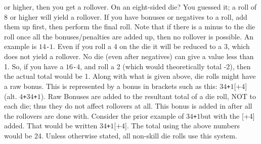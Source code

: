 \documentclass[twoside]{book}
\begin{document}
               or higher, then you get a rollover. On an eight-sided die?
               You guessed it; a roll of 8 or higher will yield a
               rollover.  If you have bonuses or negatives to a roll, add them
               up first, then perform the final roll.  Note that if there is a minus to the die roll once
               all the bonuses/penalties are added up, then no rollover
               is possible. An example is \ensuremath{1}\ensuremath{4}\texttt{-}\ensuremath{1}. Even if you roll a 4 on
               the die it will be reduced to a 3, which does not yield a
               rollover. No die (even after negatives) can give a value
               less than 1. So, if you have a \ensuremath{1}\ensuremath{6}\texttt{-}\ensuremath{4}, and roll a 2 (which
               would theoretically total -2), then the actual total would
               be 1.  Along with what is given above, die rolls might have
               a raw bonus. This is represented by a bonus in brackets
               such as this: \ensuremath{3}\ensuremath{4}\texttt{+}\ensuremath{1}\textscbf{}[\ensuremath{\texttt{+}\ensuremath{4}}](alt. \ensuremath{4}\texttt{+}\ensuremath{3}\ensuremath{4}\texttt{+}\ensuremath{1}). Raw Bonuses are
               added to the resultant total of a die roll, NOT to each
               die; thus they do not affect rollovers at all. This bonus
               is added in after all the rollovers are done with.
               Consider the prior example of \ensuremath{3}\ensuremath{4}\texttt{+}\ensuremath{1}but with the [+4]
               added. That would be written \ensuremath{3}\ensuremath{4}\texttt{+}\ensuremath{1}\textscbf{}[\ensuremath{\texttt{+}\ensuremath{4}}]. The total using
               the above numbers would be 24.  Unless otherwise stated, all non-skill die rolls use
               this system. 
    
\end{document}
